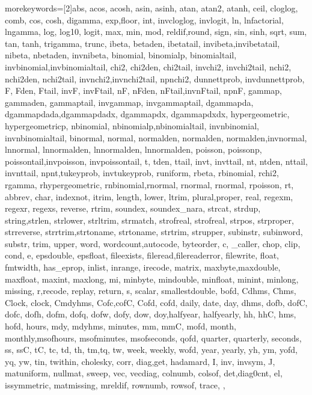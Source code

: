 {	morekeywords=[2]{abs, acos, acosh, asin, asinh, atan, atan2, atanh, ceil, cloglog, comb, cos, cosh, digamma, exp,floor, int, invcloglog, invlogit, ln, lnfactorial, lngamma, log, log10, logit, max, min, mod, reldif,round, sign, sin, sinh, sqrt, sum, tan, tanh, trigamma, trunc, ibeta, betaden, ibetatail, invibeta,invibetatail, nibeta, nbetaden, invnibeta, binomial, binomialp, binomialtail, invbinomial,invbinomialtail, chi2, chi2den, chi2tail, invchi2, invchi2tail, nchi2, nchi2den, nchi2tail, invnchi2,invnchi2tail, npnchi2, dunnettprob, invdunnettprob, F, Fden, Ftail, invF, invFtail, nF, nFden, nFtail,invnFtail, npnF, gammap, gammaden, gammaptail, invgammap, invgammaptail, dgammapda, dgammapdada,dgammapdadx, dgammapdx, dgammapdxdx, hypergeometric, hypergeometricp, nbinomial, nbinomialp,nbinomialtail, invnbinomial, invnbinomialtail, binormal, normal, normalden, normalden, normalden,invnormal, lnnormal, lnnormalden, lnnormalden, lnnormalden, poisson, poissonp, poissontail,invpoisson, invpoissontail, t, tden, ttail, invt, invttail, nt, ntden, nttail, invnttail, npnt,tukeyprob, invtukeyprob, runiform, rbeta, rbinomial, rchi2, rgamma, rhypergeometric, rnbinomial,rnormal, rnormal, rnormal, rpoisson, rt, abbrev, char, indexnot, itrim, length, lower, ltrim, plural,proper, real, regexm, regexr, regexs, reverse, rtrim, soundex, soundex_nara, strcat, strdup, string,strlen, strlower, strltrim, strmatch, strofreal, strofreal, strpos, strproper, strreverse, strrtrim,strtoname, strtoname, strtrim, strupper, subinstr, subinword, substr, trim, upper, word, wordcount,autocode, byteorder, c, _caller, chop, clip, cond, e, epsdouble, epsfloat, fileexists, fileread,filereaderror, filewrite, float, fmtwidth, has_eprop, inlist, inrange, irecode, matrix, maxbyte,maxdouble, maxfloat, maxint, maxlong, mi, minbyte, mindouble, minfloat, minint, minlong, missing, r,recode, replay, return, s, scalar, smallestdouble, bofd, Cdhms, Chms, Clock, clock, Cmdyhms, Cofc,cofC, Cofd, cofd, daily, date, day, dhms, dofb, dofC, dofc, dofh, dofm, dofq, dofw, dofy, dow, doy,halfyear, halfyearly, hh, hhC, hms, hofd, hours, mdy, mdyhms, minutes, mm, mmC, mofd, month, monthly,msofhours, msofminutes, msofseconds, qofd, quarter, quarterly, seconds, ss, ssC, tC, tc, td, th, tm,tq, tw, week, weekly, wofd, year, yearly, yh, ym, yofd, yq, yw, tin, twithin, cholesky, corr, diag,get, hadamard, I, inv, invsym, J, matuniform, nullmat, sweep, vec, vecdiag, colnumb, colsof, det,diag0cnt, el, issymmetric, matmissing, mreldif, rownumb, rowsof, trace,
	},
}






{\lstset{language=statax}}
{}